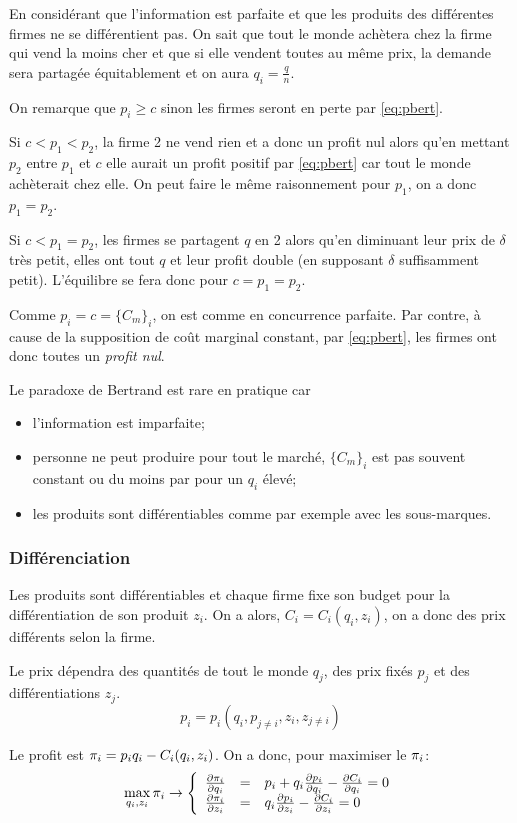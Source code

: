 En considérant que l'information est parfaite et que les produits
des différentes firmes ne se différentient pas.
On sait que tout le monde achètera chez la firme qui vend la moins cher
et que si elle vendent toutes au même prix,
la demande sera partagée équitablement et on aura $q_i = \frac{q}{n}$.

On remarque que $p_i \geq c$ sinon les firmes seront en perte
par \eqref{eq:pbert}.

Si $c < p_1 < p_2$, la firme 2 ne vend rien et a donc un profit nul
alors qu'en mettant $p_2$ entre $p_1$ et $c$ elle aurait un profit positif
par \eqref{eq:pbert} car tout le monde achèterait chez elle.
On peut faire le même raisonnement pour $p_1$,
on a donc $p_1 = p_2$.

Si $c < p_1 = p_2$, les firmes se partagent $q$ en 2 alors qu'en diminuant
leur prix de $\delta$ très petit, elles ont tout $q$ et leur profit double
(en supposant $\delta$ suffisamment petit).
L'équilibre se fera donc pour $c = p_1 = p_2$.

Comme $p_i = c = \{C_m\}_i$, on est comme en concurrence parfaite.
Par contre, à cause de la supposition de coût marginal constant,
par \eqref{eq:pbert}, les firmes ont donc toutes un \emph{profit nul}.

Le paradoxe de Bertrand est rare en pratique car
\begin{itemize}
  \item l'information est imparfaite;
  \item personne ne peut produire pour
    tout le marché, $\{C_m\}_i$ est pas souvent constant ou du moins
    par pour un $q_i$ élevé;
  \item les produits sont différentiables comme par
    exemple avec les sous-marques.
\end{itemize}


\subsubsection{Différenciation}
Les produits sont différentiables et chaque firme fixe son budget
pour la différentiation de son produit $z_i$.
On a alors, $C_i = C_i(q_i, z_i)$, on a donc des prix différents selon la firme.

Le prix dépendra des quantités de tout le monde $q_j$,
des prix fixés $p_j$ et des différentiations $z_j$.
$$p_i = p_i(q_i, p_{j\neq i}, z_i, z_{j \neq i})$$

Le profit est $\pi_i = p_iq_i - C_i(q_i, z_i)$.
On a donc, pour maximiser le $\pi_i$:
\begin{equation}
\max_{q_i, z_i} \pi_i \rightarrow
\left\lbrace
\begin{array}{lcl}
\frac{\partial \pi_i}{\partial q_i} &=&
p_i + q_i\frac{\partial p_i}{\partial q_i} - \frac{\partial C_i}{\partial q_i} = 0\\
\frac{\partial \pi_i}{\partial z_i} &=&
q_i\frac{\partial p_i}{\partial z_i} - \frac{\partial C_i}{\partial z_i} = 0
\end{array}
\right.
\end{equation}

